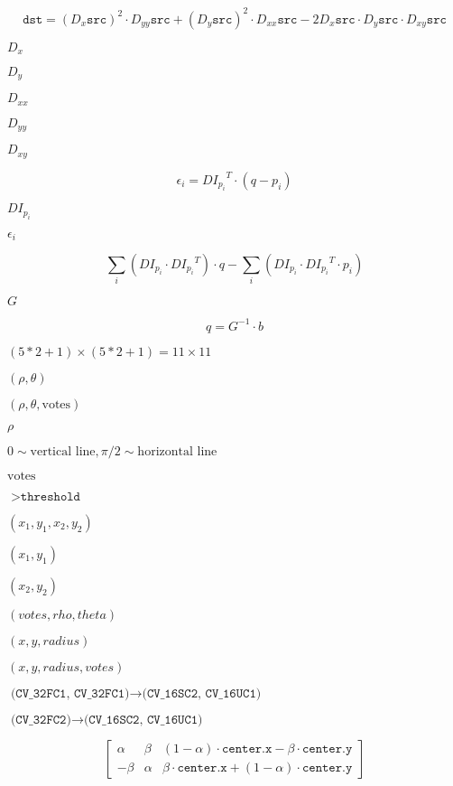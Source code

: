 \documentclass{article}
\begin{document}
\[\texttt{dst} = (D_x \texttt{src} )^2 \cdot D_{yy} \texttt{src} + (D_y \texttt{src} )^2 \cdot D_{xx} \texttt{src} - 2 D_x \texttt{src} \cdot D_y \texttt{src} \cdot D_{xy} \texttt{src}\]
\pagebreak

$D_x$
\pagebreak

$D_y$
\pagebreak

$D_{xx}$
\pagebreak

$D_{yy}$
\pagebreak

$D_{xy}$
\pagebreak

\[\epsilon _i = {DI_{p_i}}^T \cdot (q - p_i)\]
\pagebreak

${DI_{p_i}}$
\pagebreak

$\epsilon_i$
\pagebreak

\[\sum _i(DI_{p_i} \cdot {DI_{p_i}}^T) \cdot q - \sum _i(DI_{p_i} \cdot {DI_{p_i}}^T \cdot p_i)\]
\pagebreak

$G$
\pagebreak

\[q = G^{-1} \cdot b\]
\pagebreak

$(5*2+1) \times (5*2+1) = 11 \times 11$
\pagebreak

$(\rho, \theta)$
\pagebreak

$(\rho, \theta, \textrm{votes})$
\pagebreak

$\rho$
\pagebreak

$0 \sim \textrm{vertical line}, \pi/2 \sim \textrm{horizontal line}$
\pagebreak

$\textrm{votes}$
\pagebreak

$>\texttt{threshold}$
\pagebreak

$(x_1, y_1, x_2, y_2)$
\pagebreak

$(x_1,y_1)$
\pagebreak

$(x_2, y_2)$
\pagebreak

$(votes, rho, theta)$
\pagebreak

$(x, y, radius)$
\pagebreak

$(x, y, radius, votes)$
\pagebreak

$\texttt{(CV_32FC1, CV_32FC1)} \rightarrow \texttt{(CV_16SC2, CV_16UC1)}$
\pagebreak

$\texttt{(CV_32FC2)} \rightarrow \texttt{(CV_16SC2, CV_16UC1)}$
\pagebreak

\[\begin{bmatrix} \alpha & \beta & (1- \alpha ) \cdot \texttt{center.x} - \beta \cdot \texttt{center.y} \\ - \beta & \alpha & \beta \cdot \texttt{center.x} + (1- \alpha ) \cdot \texttt{center.y} \end{bmatrix}\]
\pagebreak
\end{document}
